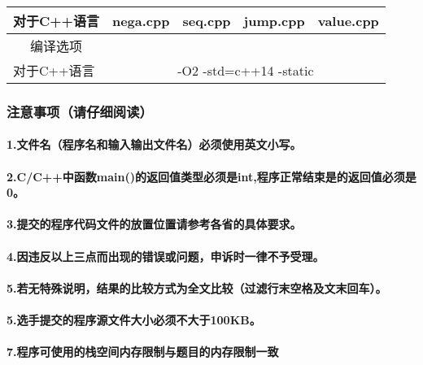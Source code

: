 \documentclass[final,11pt,oneside,UTF8]{report}
\begin{document}
\begin{table}[H]
\begin{tabular}{ccccc}
    \multicolumn{1}{|c|}{对于C++语言} & \multicolumn{1}{c|}{nega.cpp} & \multicolumn{1}{c|}{seq.cpp} & \multicolumn{1}{c|}{jump.cpp} & \multicolumn{1}{c|}{value.cpp} \\ \hline
    编译选项                          &                               &                              &                               &                                \\ \hline
    \multicolumn{1}{|l|}{对于C++语言} & \multicolumn{4}{c|}{-O2 -std=c++14 -static}                                                                                   \\ \hline
    \end{tabular}
\end{table}
\begin{spacing}{0}
    \subsubsection{注意事项（请仔细阅读）}
    \paragraph{1.文件名（程序名和输入输出文件名）必须使用英文小写。}
    \paragraph{2.C/C++中函数main()的返回值类型必须是int,程序正常结束是的返回值必须是0。}
    \paragraph{3.提交的程序代码文件的放置位置请参考各省的具体要求。}
    \paragraph{4.因违反以上三点而出现的错误或问题，申诉时一律不予受理。}
    \paragraph{5.若无特殊说明，结果的比较方式为全文比较（过滤行末空格及文末回车）。}
    \paragraph{5.选手提交的程序源文件大小必须不大于100KB。}
    \paragraph{7.程序可使用的栈空间内存限制与题目的内存限制一致}

\end{spacing}
\end{document}
